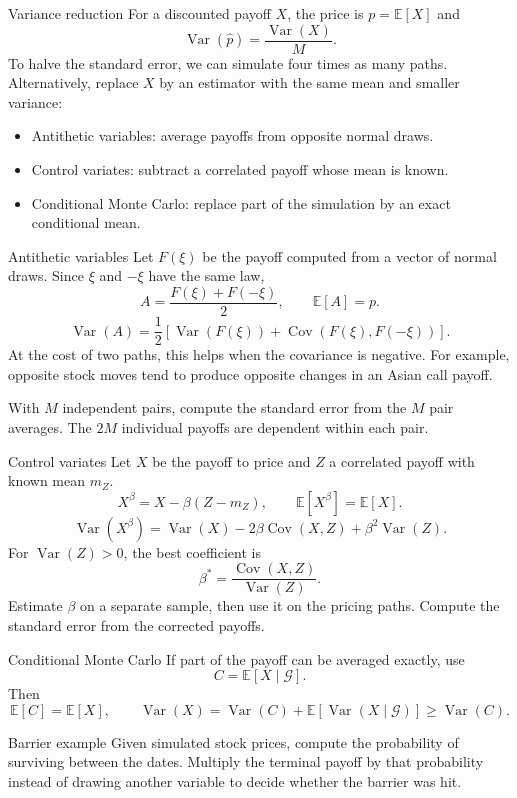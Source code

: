 \documentclass[handout,10pt,t,aspectratio=169]{beamer}
\newcommand{\E}{\mathbb E}
\newcommand{\Var}{\operatorname{Var}}
\newcommand{\Cov}{\operatorname{Cov}}
\begin{document}
\begin{frame}{Variance reduction}
\small
For a discounted payoff \(X\), the price is \(p=\E[X]\) and
\[
 \Var(\widehat p)=\frac{\Var(X)}M.
\]
To halve the standard error, we can simulate four times as many paths.
Alternatively, replace \(X\) by an estimator with the same mean and smaller variance:
\begin{itemize}
\item Antithetic variables: average payoffs from opposite normal draws.
\item Control variates: subtract a correlated payoff whose mean is known.
\item Conditional Monte Carlo: replace part of the simulation by an exact conditional mean.
\end{itemize}
\end{frame}
\begin{frame}{Antithetic variables}
\small
Let \(F(\xi)\) be the payoff computed from a vector of normal draws.
Since \(\xi\) and \(-\xi\) have the same law,
\[
 A=\frac{F(\xi)+F(-\xi)}2,\qquad \E[A]=p.
\]
\[
 \Var(A)=\frac12\left[\Var(F(\xi))+\Cov(F(\xi),F(-\xi))\right].
\]
At the cost of two paths, this helps when the covariance is negative.
For example, opposite stock moves tend to produce opposite changes in an Asian call payoff.

\medskip
With \(M\) independent pairs, compute the standard error from the \(M\)
pair averages. The \(2M\) individual payoffs are dependent within each pair.
\end{frame}
\begin{frame}{Control variates}
\small
Let \(X\) be the payoff to price and \(Z\) a correlated payoff with known mean \(m_Z\).
\[
 X^\beta=X-\beta(Z-m_Z),\qquad \E[X^\beta]=\E[X].
\]
\[
 \Var(X^\beta)=\Var(X)-2\beta\Cov(X,Z)+\beta^2\Var(Z).
\]
For \(\Var(Z)>0\), the best coefficient is
\[
 \boxed{\beta^*=\frac{\Cov(X,Z)}{\Var(Z)}.}
\]
Estimate \(\beta\) on a separate sample, then use it on the pricing paths.
Compute the standard error from the corrected payoffs.
\end{frame}
\begin{frame}{Conditional Monte Carlo}
\small
If part of the payoff can be averaged exactly, use
\[
 C=\E[X\mid\mathcal G].
\]
Then
\[
 \E[C]=\E[X],\qquad
 \Var(X)=\Var(C)+\E[\Var(X\mid\mathcal G)]\geq\Var(C).
\]
\begin{block}{Barrier example}
Given simulated stock prices, compute the probability of surviving between
the dates. Multiply the terminal payoff by that probability instead of
drawing another variable to decide whether the barrier was hit.
\end{block}
\end{frame}
\end{document}
